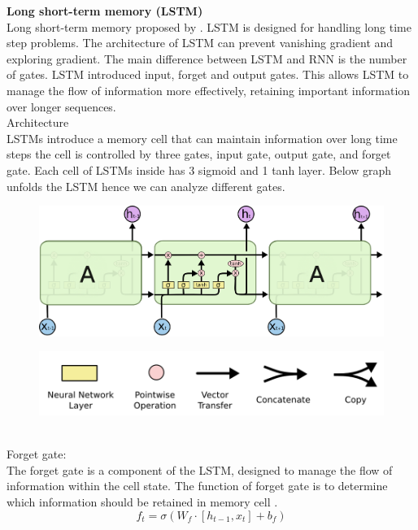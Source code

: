 \documentclass[12pt,a4paper]{article}
\begin{document}
\newpage
\textbf{Long short-term memory (LSTM)}
\\[2ex]
Long short-term memory proposed by \parencite{hochreiter1997lstm}. LSTM is designed for handling long time step problems. The architecture of LSTM can prevent vanishing gradient and exploring gradient. The main difference between LSTM and RNN is the number of gates. LSTM introduced input, forget and output gates. This allows LSTM to manage the flow of information more effectively, retaining important information over longer sequences.
\\[2ex]
Architecture
\\[1ex]
LSTMs introduce a memory cell that can maintain information over long time steps the cell is controlled by three gates, input gate, output gate, and forget gate. Each cell of LSTMs inside has 3 sigmoid and 1 tanh layer. Below graph unfolds the LSTM hence we can analyze different gates.
\begin{figure}[!htb]
    \centering
    \includegraphics[width=1\textwidth]{../Pic/lstm1.png} %
\end{figure}
\begin{figure}[!htb]
    \centering
    \includegraphics[width=1\textwidth]{../Pic/lstm2.png} %
\end{figure}
\\
Forget gate:
\\[1ex]
The forget gate is a component of the LSTM, designed to manage the flow of information within the cell state. The function of forget gate is to determine which information should be retained in memory cell \parencite{hochreiter1997lstm}.
\begin{equation}
    f_t = \sigma( W_f \cdot [ h_{t-1} , x_t ] + b_f ) 
\end{equation}
\end{document}
